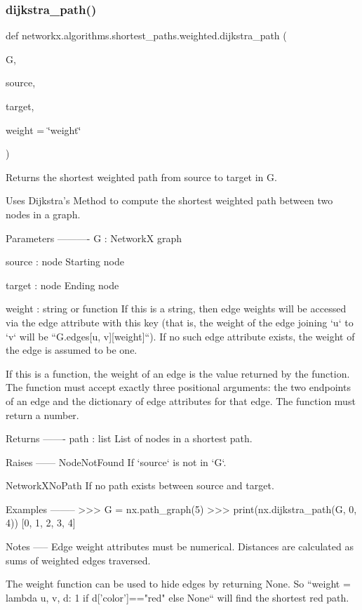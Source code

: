 \subsubsection{\texorpdfstring{dijkstra\+\_\+path()}{dijkstra\_path()}}
{\footnotesize\ttfamily def networkx.\+algorithms.\+shortest\+\_\+paths.\+weighted.\+dijkstra\+\_\+path (\begin{DoxyParamCaption}\item[{}]{G,  }\item[{}]{source,  }\item[{}]{target,  }\item[{}]{weight = {\ttfamily \char`\"{}weight\char`\"{}} }\end{DoxyParamCaption})}

\begin{DoxyVerb}Returns the shortest weighted path from source to target in G.

Uses Dijkstra's Method to compute the shortest weighted path
between two nodes in a graph.

Parameters
----------
G : NetworkX graph

source : node
    Starting node

target : node
    Ending node

weight : string or function
    If this is a string, then edge weights will be accessed via the
    edge attribute with this key (that is, the weight of the edge
    joining `u` to `v` will be ``G.edges[u, v][weight]``). If no
    such edge attribute exists, the weight of the edge is assumed to
    be one.

    If this is a function, the weight of an edge is the value
    returned by the function. The function must accept exactly three
    positional arguments: the two endpoints of an edge and the
    dictionary of edge attributes for that edge. The function must
    return a number.

Returns
-------
path : list
    List of nodes in a shortest path.

Raises
------
NodeNotFound
    If `source` is not in `G`.

NetworkXNoPath
    If no path exists between source and target.

Examples
--------
>>> G = nx.path_graph(5)
>>> print(nx.dijkstra_path(G, 0, 4))
[0, 1, 2, 3, 4]

Notes
-----
Edge weight attributes must be numerical.
Distances are calculated as sums of weighted edges traversed.

The weight function can be used to hide edges by returning None.
So ``weight = lambda u, v, d: 1 if d['color']=="red" else None``
will find the shortest red path.


\end{DoxyVerb}
